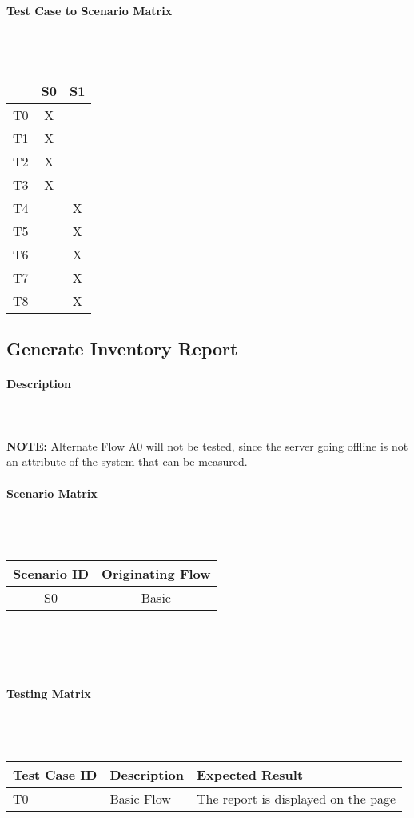 \documentclass{article}
\begin{document}
\paragraph{Test Case to Scenario Matrix}~\\ \\
\begin{tabular}{ | c || c | c | }
\hline
    & S0 & S1 \\
\hline
\hline
T0 & X  &    \\
\hline
T1 & X  &    \\
\hline
T2 & X  &    \\
\hline
T3 & X  &    \\
\hline
T4 &    & X  \\
\hline
T5 &    & X  \\
\hline
T6 &    & X  \\
\hline
T7 &    & X  \\
\hline
T8 &    & X  \\
\hline
\end{tabular}

\subsection{Generate Inventory Report}
\paragraph{Description}
~\\ \\
\textbf{NOTE:} Alternate Flow A0 will not be tested, since the server going offline is not an attribute of the system that can be measured.

\paragraph{Scenario Matrix}~\\ \\
\begin{tabular}{ c  c }
\hline
Scenario ID & Originating Flow \\
\hline
\hline
S0 & Basic \\
\hline
\end{tabular}\\
~\\
~\\
\paragraph{Testing Matrix}~\\ \\
\begin{tabular}{ p{1.0in}  p{2.1in}  p{2.2in} }
\hline
Test Case ID & Description & Expected Result\\
\hline
\hline
T0 & Basic Flow & The report is displayed on the page\\
\hline
\end{tabular}\\
~\\
~\\
\end{document}
